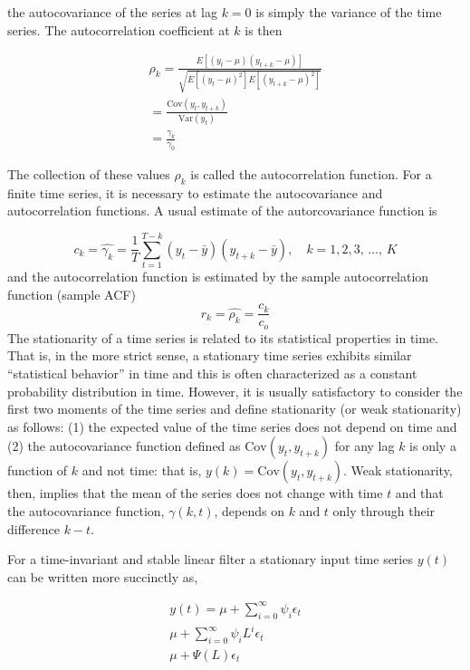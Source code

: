 \documentclass[
  11pt,
]{article}
\begin{document}
the autocovariance of the series at lag \(k = 0\) is simply the variance
of the time series. The autocorrelation coefficient at \(k\) is then

\begin{gather*}
\rho_{k} = \frac{E[(y_{t} - \mu)(y_{t+k} -\mu)]}{\sqrt{E[(y_{t} - \mu)^{2}]E[(y_{t+k} - \mu)^{2}]}} \\[8pt]
= \frac{\mathrm{Cov}(y_{t}, y_{t+k})}{\mathrm{Var}(y_{t})}\\[8pt]
= \frac{\gamma_{k}}{\gamma_{0}}
\end{gather*}

The collection of these values \(\rho_{k}\) is called the
autocorrelation function. For a finite time series, it is necessary to
estimate the autocovariance and autocorrelation functions. A usual
estimate of the autorcovariance function is

\[
c_{k} = \hat{\gamma_{k}} = \frac{1}{T} \sum\limits_{t = 1}^{T-k}(y_{t} -\bar{y})(y_{t+k} - \bar{y}), \quad k = 1, 2, 3,\, \ldots,\, K
\] and the autocorrelation function is estimated by the sample
autocorrelation function (sample ACF) \[
r_{k} = \hat{\rho_{k}} = \frac{c_{k}}{c_{o}}
\] The stationarity of a time series is related to its statistical
properties in time. That is, in the more strict sense, a stationary time
series exhibits similar ``statistical behavior'' in time and this is
often characterized as a constant probability distribution in time.
However, it is usually satisfactory to consider the first two moments of
the time series and define stationarity (or weak stationarity) as
follows: (1) the expected value of the time series does not depend on
time and (2) the autocovariance function defined as
\(\mathrm{Cov}(y_{t}, y_{t+k})\) for any lag \(k\) is only a function of
\(k\) and not time: that is, \(y(k) = \mathrm{Cov}(y_{t}, y_{t+k})\).
Weak stationarity, then, implies that the mean of the series does not
change with time \(t\) and that the autocovariance function,
\(\gamma(k, t)\), depends on \(k\) and \(t\) only through their
difference \(k - t\).

For a time-invariant and stable linear filter a stationary input time
series \(y(t)\) can be written more succinctly as,

\begin{gather*}
y(t) = \mu + \sum\limits_{i= 0}^{\infty}\psi_{i}\epsilon_{t} \\[8pt]
\mu + \sum\limits_{i=0}^{\infty}\psi_{i}L^{i}\epsilon_{t} \\[8pt]
\mu + \Psi(L)\epsilon_{t}
\end{gather*}
\end{document}
